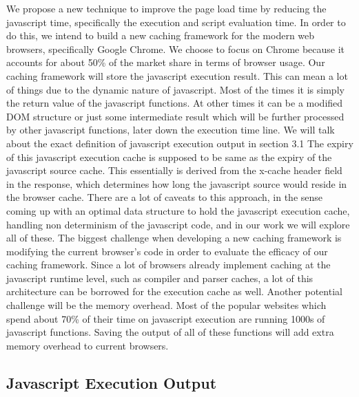 We propose a new technique to improve the page load time by reducing the javascript time,
specifically the execution and script evaluation time.  
In order to do this, we intend to build a new caching framework for the modern web browsers,
specifically Google Chrome. We choose to focus on Chrome because it accounts for about 50\% of the market share in terms of browser
usage. Our caching framework will store the javascript execution result. This can mean a lot of things
due to the dynamic nature of javascript. Most of the times it is simply the return value of the 
javascript functions. At other times it can be a modified DOM structure or just some intermediate result which
will be further processed by other javascript functions, later down the execution time line. 
We will talk about the exact definition of javascript execution output in section 3.1
The expiry of this javascript execution cache is supposed to be same as the expiry of the javascript source cache.
This essentially is derived from the x-cache header field in the response, which determines how long
the javascript source would reside in the browser cache. 
There are a lot of caveats to this approach, in the sense coming up with an optimal data structure to hold the 
javascript execution cache, handling non determinism of the javascript code, and in our work we will explore all of these.
The biggest challenge when developing a new caching framework is modifying the current browser's code 
in order to evaluate the efficacy of our caching framework. Since a lot of browsers already implement caching
at the javascript runtime level, such as compiler and parser caches, a lot of this architecture can be borrowed
for the execution cache as well. 
Another potential challenge will be the memory overhead. Most of the popular websites which spend about 70\% 
of their time on javascript execution are running 1000s of javascript functions. Saving the output of all 
of these functions will add extra memory overhead to current browsers. 

\subsection{Javascript Execution Output}
\label{sec:exec-output}


